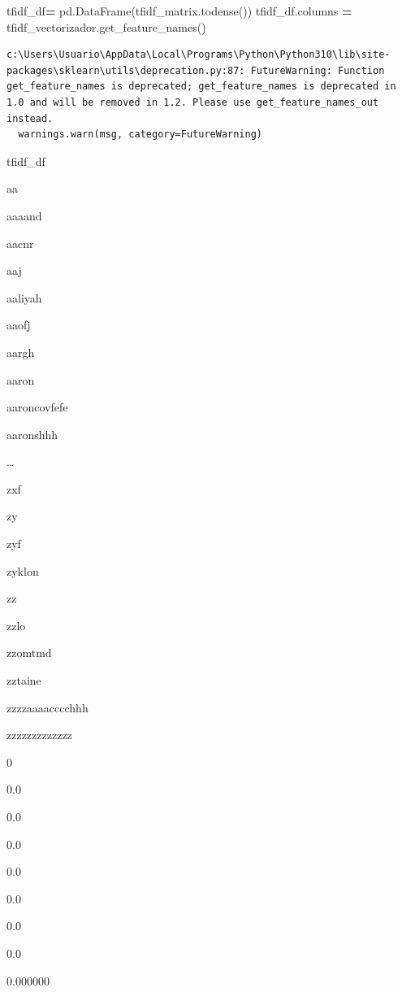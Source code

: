\documentclass[
  11pt,
  a4paper,
]{article}
\newenvironment{Shaded}{\begin{snugshade}}{\end{snugshade}}
\newcommand{\NormalTok}[1]{#1}
\newcommand{\OperatorTok}[1]{\textcolor[rgb]{0.81,0.36,0.00}{\textbf{#1}}}
\begin{document}
\begin{Shaded}
\begin{Highlighting}[]
\NormalTok{tfidf\_df}\OperatorTok{=}\NormalTok{ pd.DataFrame(tfidf\_matrix.todense())  }
\NormalTok{tfidf\_df.columns }\OperatorTok{=}\NormalTok{ tfidf\_vectorizador.get\_feature\_names()}
\end{Highlighting}
\end{Shaded}

\begin{verbatim}
c:\Users\Usuario\AppData\Local\Programs\Python\Python310\lib\site-packages\sklearn\utils\deprecation.py:87: FutureWarning: Function get_feature_names is deprecated; get_feature_names is deprecated in 1.0 and will be removed in 1.2. Please use get_feature_names_out instead.
  warnings.warn(msg, category=FutureWarning)
\end{verbatim}

\begin{Shaded}
\begin{Highlighting}[]
\NormalTok{tfidf\_df}
\end{Highlighting}
\end{Shaded}

aa

aaaand

aacnr

aaj

aaliyah

aaofj

aargh

aaron

aaroncovfefe

aaronshhh

\ldots{}

zxf

zy

zyf

zyklon

zz

zzlo

zzomtmd

zztaine

zzzzaaaacccchhh

zzzzzzzzzzzzz

0

0.0

0.0

0.0

0.0

0.0

0.0

0.0

0.000000
\end{document}
